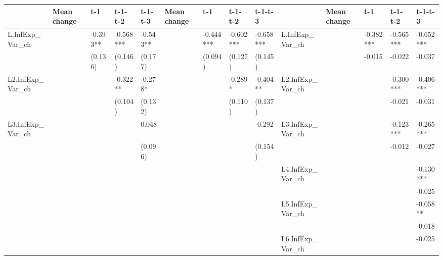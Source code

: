 \documentclass[]{article}
\begin{document}
\begin{table}
\begin{adjustbox}{width={24cm},totalheight={14cm},angle=90}
\begin{tabular}{llllllllllllll}
				& Mean change & t-1       & t-1- t-2  & t-1-t-3   & Mean change   & t-1       & t-1- t-2  & t-1-t-3   &                      & Mean change   & t-1       & t-1- t-2  & t-1-t-3   \\
				\hline 
				L.InfExp\_Var\_ch    &             & -0.393**  & -0.568*** & -0.543**  &               & -0.444*** & -0.602*** & -0.658*** & L.InfExp\_Var\_ch    &               & -0.382*** & -0.565*** & -0.652*** \\
				&             & (0.136)   & (0.146)   & (0.177)   &               & (0.094)   & (0.127)   & (0.145)   &                      &               & -0.015    & -0.022    & -0.037    \\
				L2.InfExp\_Var\_ch   &             &           & -0.322**  & -0.278*   &               &           & -0.289*   & -0.404**  & L2.InfExp\_Var\_ch   &               &           & -0.300*** & -0.406*** \\
				&             &           & (0.104)   & (0.132)   &               &           & (0.110)   & (0.137)   &                      &               &           & -0.021    & -0.031    \\
				L3.InfExp\_Var\_ch   &             &           &           & 0.048     &               &           &           & -0.292    & L3.InfExp\_Var\_ch   &               &           & -0.123*** & -0.265*** \\
				&             &           &           & (0.096)   &               &           &           & (0.154)   &                      &               &           & -0.012    & -0.027    \\
				&             &           &           &           &               &           &           &           & L4.InfExp\_Var\_ch   &               &           &           & -0.130*** \\
				&             &           &           &           &               &           &           &           &                      &               &           &           & -0.025    \\
				&             &           &           &           &               &           &           &           & L5.InfExp\_Var\_ch   &               &           &           & -0.058**  \\
				&             &           &           &           &               &           &           &           &                      &               &           &           & -0.018    \\
				&             &           &           &           &               &           &           &           & L6.InfExp\_Var\_ch   &               &           &           & -0.025    \\

\end{tabular}
\end{adjustbox}
\end{table}
\end{document}
